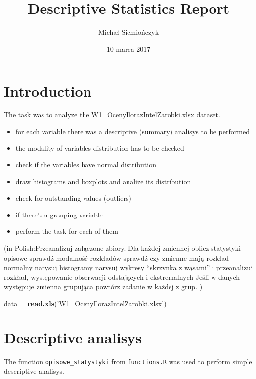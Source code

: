 \documentclass[]{article}
\title{Descriptive Statistics Report}
\author{Michał Siemiończyk}
\date{10 marca 2017}
\newenvironment{Shaded}{\begin{snugshade}}{\end{snugshade}}
\newcommand{\KeywordTok}[1]{\textcolor[rgb]{0.13,0.29,0.53}{\textbf{{#1}}}}
\newcommand{\StringTok}[1]{\textcolor[rgb]{0.31,0.60,0.02}{{#1}}}
\newcommand{\NormalTok}[1]{{#1}}
\providecommand{\tightlist}{%
  \setlength{\itemsep}{0pt}\setlength{\parskip}{0pt}}
\begin{document}
\maketitle

{
\setcounter{tocdepth}{2}
\tableofcontents
}
\section{Introduction}\label{introduction}

The task was to analyze the W1\_OcenyIlorazIntelZarobki.xlsx dataset.

\begin{itemize}
\tightlist
\item
  for each variable there was a descriptive (summary) analisys to be
  performed
\item
  the modality of variables distribution has to be checked
\item
  check if the variables have normal distribution
\item
  draw histograms and boxplots and analize its distribution
\item
  check for outstanding values (outliers)
\item
  if there's a grouping variable
\item
  perform the task for each of them
\end{itemize}

(in Polish:Przeanalizuj załączone zbiory. Dla każdej zmiennej oblicz
statystyki opisowe sprawdź modalność rozkładów sprawdź czy zmienne mają
rozkład normalny narysuj histogramy narysuj wykresy ``skrzynka z
wąsami'' i przeanalizuj rozkład, występowanie obserwacji odstających i
ekstremalnych Jeśli w danych występuje zmienna grupująca powtórz zadanie
w każdej z grup. )

\begin{Shaded}
\begin{Highlighting}[]
\NormalTok{data =}\StringTok{ }\KeywordTok{read.xls}\NormalTok{(}\StringTok{'W1_OcenyIlorazIntelZarobki.xlsx'}\NormalTok{)}
\end{Highlighting}
\end{Shaded}

\section{Descriptive analisys}\label{descriptive-analisys}

The function \texttt{opisowe\_statystyki} from \texttt{functions.R} was
used to perform simple descriptive analisys.
\end{document}
